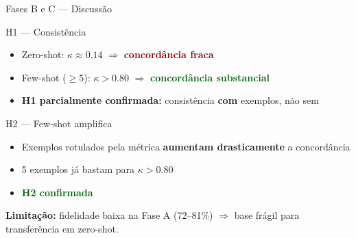 \documentclass[aspectratio=169,12pt]{beamer}
\newcommand{\warn}[1]{\textcolor{darkred}{\textbf{#1}}}
\newcommand{\good}[1]{\textcolor{darkgreen}{\textbf{#1}}}
\begin{document}
\begin{frame}{Fases B e C --- Discussão}
\begin{block}{H1 --- Consistência}
\begin{itemize}
    \item Zero-shot: $\kappa \approx 0.14$ $\Rightarrow$ \warn{concordância fraca}
    \item Few-shot ($\geq 5$): $\kappa > 0.80$ $\Rightarrow$ \good{concordância substancial}
    \item \textbf{H1 parcialmente confirmada:} consistência \textbf{com} exemplos, não sem
\end{itemize}
\end{block}

\begin{block}{H2 --- Few-shot amplifica}
\begin{itemize}
    \item Exemplos rotulados pela métrica \textbf{aumentam drasticamente} a concordância
    \item 5 exemplos já bastam para $\kappa > 0.80$
    \item \good{H2 confirmada}
\end{itemize}
\end{block}

\textbf{Limitação:} fidelidade baixa na Fase A (72--81\%) $\Rightarrow$ base frágil para transferência em zero-shot.
\end{frame}

\end{document}
